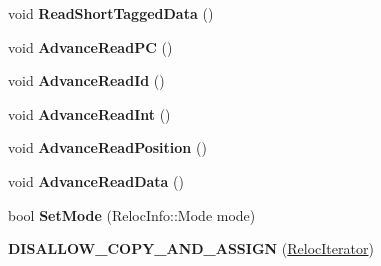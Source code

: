\begin{DoxyCompactItemize}
\item 
void {\bfseries Read\+Short\+Tagged\+Data} ()\hypertarget{classv8_1_1internal_1_1_reloc_iterator_a6b66dd1859280e7f7aa92fb05e6cfbf5}{}\label{classv8_1_1internal_1_1_reloc_iterator_a6b66dd1859280e7f7aa92fb05e6cfbf5}

\item 
void {\bfseries Advance\+Read\+PC} ()\hypertarget{classv8_1_1internal_1_1_reloc_iterator_a389e837d54a1a02fdbe43617247e92ba}{}\label{classv8_1_1internal_1_1_reloc_iterator_a389e837d54a1a02fdbe43617247e92ba}

\item 
void {\bfseries Advance\+Read\+Id} ()\hypertarget{classv8_1_1internal_1_1_reloc_iterator_aa7dcf46023a5d6a13419b0298291ea5f}{}\label{classv8_1_1internal_1_1_reloc_iterator_aa7dcf46023a5d6a13419b0298291ea5f}

\item 
void {\bfseries Advance\+Read\+Int} ()\hypertarget{classv8_1_1internal_1_1_reloc_iterator_ac61bbce836286a7c3592b469cc3a8e62}{}\label{classv8_1_1internal_1_1_reloc_iterator_ac61bbce836286a7c3592b469cc3a8e62}

\item 
void {\bfseries Advance\+Read\+Position} ()\hypertarget{classv8_1_1internal_1_1_reloc_iterator_afd055af7c7507793bb163f9d327dafae}{}\label{classv8_1_1internal_1_1_reloc_iterator_afd055af7c7507793bb163f9d327dafae}

\item 
void {\bfseries Advance\+Read\+Data} ()\hypertarget{classv8_1_1internal_1_1_reloc_iterator_ae620d3028d876b92308a6e6af94cd685}{}\label{classv8_1_1internal_1_1_reloc_iterator_ae620d3028d876b92308a6e6af94cd685}

\item 
bool {\bfseries Set\+Mode} (Reloc\+Info\+::\+Mode mode)\hypertarget{classv8_1_1internal_1_1_reloc_iterator_a1b757ab8c1ed5adf48c1fcff8f2c7b56}{}\label{classv8_1_1internal_1_1_reloc_iterator_a1b757ab8c1ed5adf48c1fcff8f2c7b56}

\item 
{\bfseries D\+I\+S\+A\+L\+L\+O\+W\+\_\+\+C\+O\+P\+Y\+\_\+\+A\+N\+D\+\_\+\+A\+S\+S\+I\+GN} (\hyperlink{classv8_1_1internal_1_1_reloc_iterator}{Reloc\+Iterator})\hypertarget{classv8_1_1internal_1_1_reloc_iterator_aefa3859cae80f8f30abd8cd463793ef6}{}\label{classv8_1_1internal_1_1_reloc_iterator_aefa3859cae80f8f30abd8cd463793ef6}

\end{DoxyCompactItemize}
